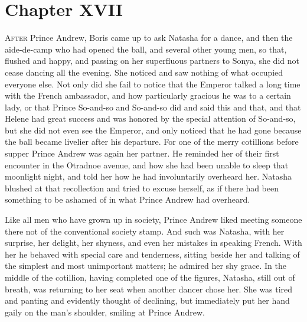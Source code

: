 
\chapter*{Chapter XVII}
\ifaudio     
{} 
\fi

\lettrine[lines=2, loversize=0.3, lraise=0]{\initfamily A}{fter}
Prince Andrew, Boris came up to ask Natasha for a dance,
and then the aide-de-camp who had opened the ball, and several
other young men, so that, flushed and happy, and passing on her
superfluous partners to Sonya, she did not cease dancing all the
evening. She noticed and saw nothing of what occupied everyone
else. Not only did she fail to notice that the Emperor talked a
long time with the French ambassador, and how particularly
gracious he was to a certain lady, or that Prince So-and-so and
So-and-so did and said this and that, and that Helene had great
success and was honored by the special attention of So-and-so,
but she did not even see the Emperor, and only noticed that he
had gone because the ball became livelier after his
departure. For one of the merry cotillions before supper Prince
Andrew was again her partner. He reminded her of their first
encounter in the Otradnoe avenue, and how she had been unable to
sleep that moonlight night, and told her how he had involuntarily
overheard her. Natasha blushed at that recollection and tried to
excuse herself, as if there had been something to be ashamed of
in what Prince Andrew had overheard.

Like all men who have grown up in society, Prince Andrew liked
meeting someone there not of the conventional society stamp. And
such was Natasha, with her surprise, her delight, her shyness,
and even her mistakes in speaking French. With her he behaved
with special care and tenderness, sitting beside her and talking
of the simplest and most unimportant matters; he admired her shy
grace. In the middle of the cotillion, having completed one of
the figures, Natasha, still out of breath, was returning to her
seat when another dancer chose her. She was tired and panting and
evidently thought of declining, but immediately put her hand
gaily on the man's shoulder, smiling at Prince Andrew.

